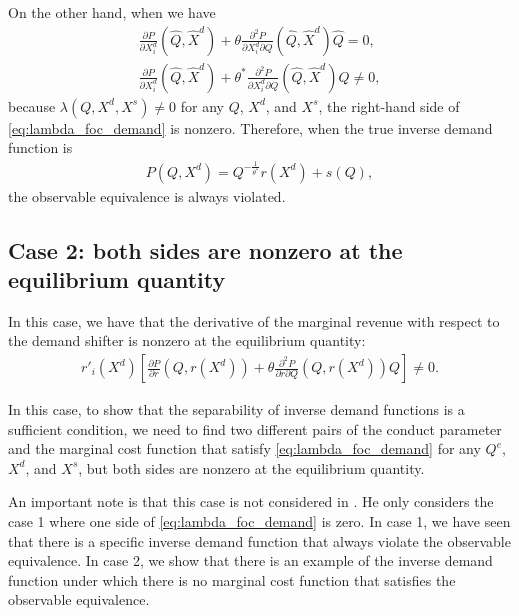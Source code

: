 \documentclass[11pt, a4paper]{article}
\theoremstyle{remark}
\begin{document}
On the other hand, when we have
\begin{align}
    \frac{\partial P}{\partial X^{d}_i}(\hat{Q}, \hat{X}^{d}) + \theta\frac{\partial^2 P}{\partial X^{d}_{i}\partial Q}(\hat{Q}, \hat{X}^{d})\hat{Q}  =  0,\\
    \frac{\partial P}{\partial X^{d}_i}(\hat{Q}, \hat{X}^{d}) + \theta^{*}\frac{\partial^2 P}{\partial X^{d}_{i}\partial Q}(\hat{Q}, \hat{X}^{d})\hat{Q}  \ne 0,
\end{align}
because $\lambda(Q, X^{d}, X^{s}) \ne 0$ for any $Q$, $X^{d}$, and $X^{s}$, the right-hand side of \eqref{eq:lambda_foc_demand} is nonzero.
Therefore, when the true inverse demand function is
\begin{align}
    P(Q, X^{d}) = Q^{-\frac{1}{\theta^{*}}} r(X^{d}) + s(Q),
\end{align}
the observable equivalence is always violated.









\subsection{Case 2: both sides are nonzero at the equilibrium quantity}
In this case, we have that the derivative of the marginal revenue with respect to the demand shifter is nonzero at the equilibrium quantity:
\begin{align}
    r'_i(X^{d})\left[\frac{\partial P}{\partial r}(Q, r(X^{d})) + \theta\frac{\partial^2 P}{\partial r\partial Q}(Q, r(X^{d}))Q\right] \ne 0.
\end{align}

In this case, to show that the separability of inverse demand functions is a sufficient condition, we need to find two different pairs of the conduct parameter and the marginal cost function that satisfy \eqref{eq:lambda_foc_demand} for any $Q^e$, $X^{d}$, and $X^{s}$, but both sides are nonzero at the equilibrium quantity.

An important note is that this case is not considered in \citet{lau1982identifying}.
He only considers the case 1 where one side of \eqref{eq:lambda_foc_demand} is zero.
In case 1, we have seen that there is a specific inverse demand function that always violate the observable equivalence.
In case 2, we show that there is an example of the inverse demand function under which there is no marginal cost function that satisfies the observable equivalence.
\end{document}
